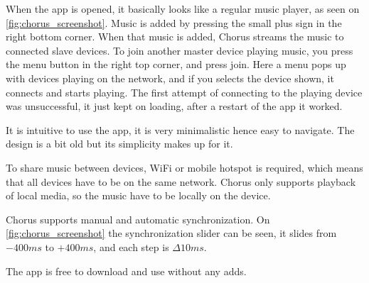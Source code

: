 When the app is opened, it basically looks like a regular music player, as seen on \cref{fig:chorus_screenshot}.
Music is added by pressing the small plus sign in the right bottom corner. 
When that music is added, Chorus streams the music to connected slave devices.
To join another master device playing music, you press the menu button in the right top corner, and press join.
Here a menu pops up with devices playing on the network, and if you selects the device shown, it connects and starts playing.
The first attempt of connecting to the playing device was unsuccessful, it just kept on loading, after a restart of the app it worked.

It is intuitive to use the app, it is very minimalistic hence easy to navigate.
The design is a bit old but its simplicity makes up for it.

To share music between devices, WiFi or mobile hotspot is required,
which means that all devices have to be on the same network.
Chorus only supports playback of local media, so the music have to be locally on the device.

Chorus supports manual and automatic synchronization.
On \cref{fig:chorus_screenshot} the synchronization slider can be seen,
it slides from $-400ms$ to $+400ms$, and each step is $\Delta 10ms$.

The app is free to download and use without any adds.\cite{chrous_play} 


